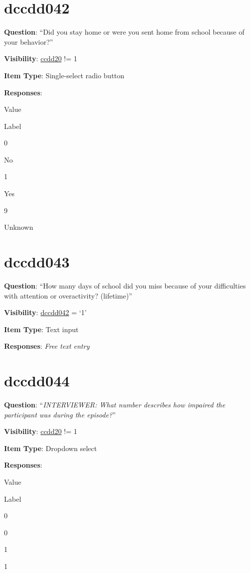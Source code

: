 \documentclass[]{book}
\begin{document}
\hypertarget{dccdd042}{%
\section{dccdd042}\label{dccdd042}}

\textbf{Question}: ``Did you stay home or were you sent home from school because of your behavior?''

\textbf{Visibility}: \protect\hyperlink{ccdd20}{ccdd20} != 1

\textbf{Item Type}: Single-select radio button

\textbf{Responses}:

Value

Label

0

No

1

Yes

9

Unknown

\hypertarget{dccdd043}{%
\section{dccdd043}\label{dccdd043}}

\textbf{Question}: ``How many days of school did you miss because of your difficulties with attention or overactivity? (lifetime)''

\textbf{Visibility}: \protect\hyperlink{dccdd042}{dccdd042} = `1'

\textbf{Item Type}: Text input

\textbf{Responses}: \emph{Free text entry}

\hypertarget{dccdd044}{%
\section{dccdd044}\label{dccdd044}}

\textbf{Question}: ``\emph{INTERVIEWER: What number describes how impaired the participant was during the episode?}''

\textbf{Visibility}: \protect\hyperlink{ccdd20}{ccdd20} != 1

\textbf{Item Type}: Dropdown select

\textbf{Responses}:

Value

Label

0

0

1

1
\end{document}
